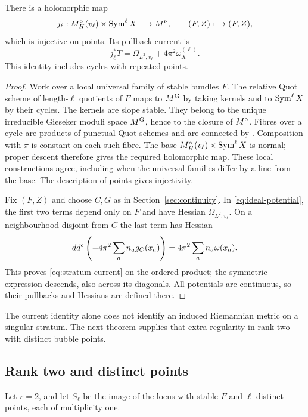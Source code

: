 \begin{theorem}\label{thm:stratum}
There is a holomorphic map
\[
 j_\ell:M^{\circ}_H(v_\ell)\times\operatorname{Sym}^\ell X\longrightarrow M^{\nu},
 \qquad (F,Z)\longmapsto(F,Z),
\]
which is injective on points. Its pullback current is
\begin{equation}\label{eq:stratum-current}
 j_\ell^*T=\Omega_{L^2,v_\ell}+4\pi^2\omega_X^{(\ell)}.
\end{equation}
This identity includes cycles with repeated points.
\end{theorem}
\begin{proof}
Work over a local universal family of stable bundles $F$.
The relative Quot scheme of length-$\ell$ quotients of $F$ maps to $M^{\mathrm G}$
by taking kernels and to $\operatorname{Sym}^\ell X$ by their cycles. The kernels are
slope stable. They belong to the unique irreducible Gieseker moduli space
$M^{\mathrm G}$, hence to the closure of $M^{\circ}$. Fibres over a cycle are products of
punctual Quot schemes and are connected by
\cite[Theorem~1]{EL99}. Composition with $\pi$ is constant on each such
fibre. The base $M^{\circ}_H(v_\ell)\times\operatorname{Sym}^\ell X$ is normal; proper descent
therefore gives the required holomorphic map. These local constructions
agree, including when the universal families differ by a line from the
base. The description of points gives injectivity.

Fix $(F,Z)$ and choose $C,G$ as in Section~\ref{sec:continuity}.
In \eqref{eq:ideal-potential}, the first two terms depend only on $F$ and
have Hessian $\Omega_{L^2,v_\ell}$. On a neighbourhood disjoint from $C$ the
last term has Hessian
\[
 dd^c\left(-4\pi^2\sum_an_ag_C(x_a)\right)
       =4\pi^2\sum_an_a\omega(x_a).
\]
This proves \eqref{eq:stratum-current} on the ordered product; the
symmetric expression descends, also across its diagonals. All potentials
are continuous, so their pullbacks and Hessians are defined there.
\end{proof}

The current identity alone does not identify an induced Riemannian metric
on a singular stratum. The next theorem supplies that extra regularity in
rank two with distinct bubble points.

\subsection{Rank two and distinct points}
Let $r=2$, and let $S_\ell$ be the image of the locus with stable $F$ and
$\ell$ distinct points, each of multiplicity one.

